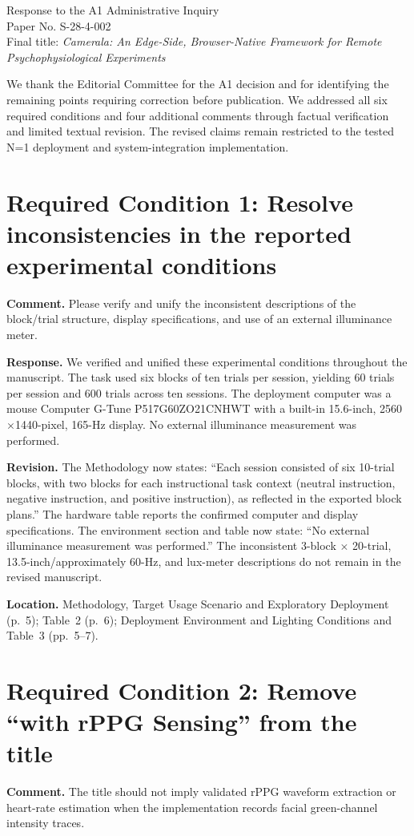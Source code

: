 \documentclass[11pt]{article}
\newcommand{\responseitem}[2]{\section*{#1: #2}}
\begin{document}
\begin{center}
{\Large Response to the A1 Administrative Inquiry}\\[4pt]
Paper No. S-28-4-002\\
Final title: \textit{Camerala: An Edge-Side, Browser-Native Framework for Remote Psychophysiological Experiments}
\end{center}

We thank the Editorial Committee for the A1 decision and for identifying the remaining points requiring correction before publication.
We addressed all six required conditions and four additional comments through factual verification and limited textual revision.
The revised claims remain restricted to the tested N=1 deployment and system-integration implementation.

\responseitem{Required Condition 1}{Resolve inconsistencies in the reported experimental conditions}

\textbf{Comment.}
Please verify and unify the inconsistent descriptions of the block/trial structure, display specifications, and use of an external illuminance meter.

\textbf{Response.}
We verified and unified these experimental conditions throughout the manuscript.
The task used six blocks of ten trials per session, yielding 60 trials per session and 600 trials across ten sessions.
The deployment computer was a mouse Computer G-Tune P517G60ZO21CNHWT with a built-in 15.6-inch, 2560$\times$1440-pixel, 165-Hz display.
No external illuminance measurement was performed.

\textbf{Revision.}
The Methodology now states: ``Each session consisted of six 10-trial blocks, with two blocks for each instructional task context (neutral instruction, negative instruction, and positive instruction), as reflected in the exported block plans.''
The hardware table reports the confirmed computer and display specifications.
The environment section and table now state: ``No external illuminance measurement was performed.''
The inconsistent 3-block $\times$ 20-trial, 13.5-inch/approximately 60-Hz, and lux-meter descriptions do not remain in the revised manuscript.

\textbf{Location.}
Methodology, Target Usage Scenario and Exploratory Deployment (p.~5); Table~2 (p.~6); Deployment Environment and Lighting Conditions and Table~3 (pp.~5--7).

\responseitem{Required Condition 2}{Remove ``with rPPG Sensing'' from the title}

\textbf{Comment.}
The title should not imply validated rPPG waveform extraction or heart-rate estimation when the implementation records facial green-channel intensity traces.
\end{document}
